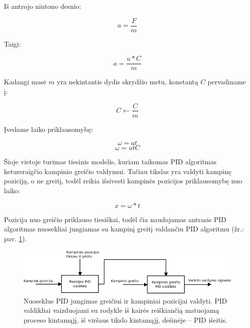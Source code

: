 \documentclass[12pt, a4paper, lithuanian, final]{article}
\begin{document}
Iš antrojo niutono desnio:

\begin{equation}
	a = \dfrac{F}{m}
\end{equation}

Taigi:

\begin{equation}
	a = \dfrac{u * C}{m}
\end{equation}

Kadangi masė $m$ yra nekintantis dydis skrydžio metu, konstantą $C$ pervadiname į:

\begin{equation}
	C \leftarrow \dfrac{C}{m}
\end{equation}

Įvedame laiko priklausomybę:

\begin{equation}
	\omega = at
\end{equation}
\begin{equation}
	\omega = utC
\end{equation}

Šioje vietoje turimas tiesinis modelis, kuriam taikomas PID algoritmas ketursraigčio kampinio greičio valdymui.
Tačiau tikslas yra valdyti kampinę poziciją, o ne greitį, todėl reikia išsivesti kampinės pozicijos priklausomybę nuo laiko:

\begin{equation}
	x =  \omega * t
\end{equation}

Pozicija nuo greičio priklauso tiesiškai, todėl čia naudojamas antrasis PID algoritmas nuosekliai jungiamas su kampinį greitį valdančiu PID algoritmu (žr.: pav. \ref{pav-PID-series}).

\begin{figure}[H]
\begin{center}
\includegraphics[width=1.0\textwidth]{img/PID-chaining.png}
\caption{Nuoseklus PID jungimas greičiui ir kampiniai pozicijai valdyti. PID valdikliai vaizduojami su rodykle iš kairės reiškiančią matuojamą proceso kintamąjį, iš viršaus tikslo kintamąjį, dešinėje -- PID išeitis.}
\label{pav-PID-series}
\end{center}
\end{figure}
\end{document}
